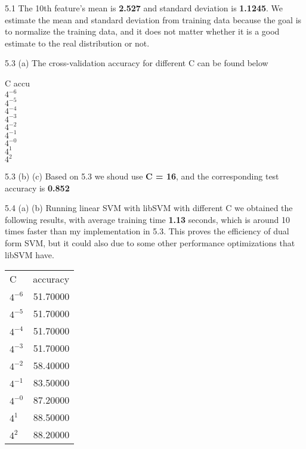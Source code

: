 \documentclass[12pt]{article}
\newenvironment{problem}[2][Problem]{\begin{trivlist}
\item[\hskip \labelsep {\bfseries #1}\hskip \labelsep {\bfseries #2}]}{\end{trivlist}}
\begin{document}
\begin{problem}{5. Programming}
\item{5.1}
The 10th feature's mean is \textbf{2.527} and standard deviation is \textbf{1.1245}. We estimate the mean and standard deviation from training data because the goal is to normalize the training data, and it does not matter whether it is a good estimate to the real distribution or not.
\item{5.3 (a)}
The cross-validation accuracy for different C can be found below
\begin{center}
	C     \:\: accu\\
	$4^{-6}$ \\
	$4^{-5}$ \\
	$4^{-4}$ \\
	$4^{-3}$ \\
	$4^{-2}$ \\
	$4^{-1}$ \\
	$4^{-0}$ \\
	$4^1$ \:\:\\
	$4^2$ \:\:\\
\end{center}
\item{5.3 (b) (c)}
Based on 5.3 we shoud use \textbf{C = 16}, and the corresponding test accuracy is \textbf{0.852}
\item{5.4 (a) (b)}
Running linear SVM with libSVM with different C we obtained the following results, with average training time \textbf{1.13} seconds, which is around 10 times faster than my implementation in 5.3. This proves the efficiency of dual form SVM, but it could also due to some other performance optimizations that libSVM have. 
\begin{center}
\begin{tabular}{ l | r}
    C &  accuracy\\
    $4^{-6}$  & 51.70000\\
    $4^{-5}$  & 51.70000\\
    $4^{-4}$  & 51.70000\\
    $4^{-3}$  & 51.70000\\
    $4^{-2}$  & 58.40000\\
    $4^{-1}$  & 83.50000\\
    $4^{-0}$  & 87.20000\\
    $4^{1}$  & 88.50000\\
    $4^{2}$  & 88.20000\\
\end{tabular}
\end{center}


\end{problem}
\end{document}
